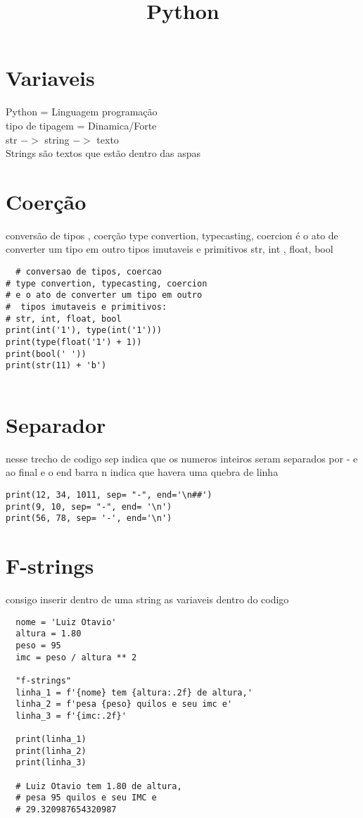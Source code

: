 \documentclass[16pts]{article}
\date{} %
\title{Python}
\begin{document}
\maketitle
\section{Variaveis}
Python = Linguagem programação\\
tipo de tipagem = Dinamica/Forte\\
str $->$ string $->$ texto\\
Strings são textos que estão dentro das aspas
\section{Coerção}
conversão de tipos , coerção
type convertion, typecasting, coercion
é o ato de converter um tipo em outro
tipos imutaveis e primitivos
str, int , float, bool 

\begin{lstlisting}
  # conversao de tipos, coercao
# type convertion, typecasting, coercion
# e o ato de converter um tipo em outro
#  tipos imutaveis e primitivos:
# str, int, float, bool
print(int('1'), type(int('1')))
print(type(float('1') + 1))
print(bool(' '))
print(str(11) + 'b')


\end{lstlisting}
\section{Separador}
nesse trecho de codigo  sep indica que os numeros inteiros seram separados
por - e ao final e o end barra n indica que havera uma quebra de linha
\begin{lstlisting}
print(12, 34, 1011, sep= "-", end='\n##')
print(9, 10, sep= "-", end= '\n')
print(56, 78, sep= '-', end='\n')
\end{lstlisting}
\section{F-strings}
consigo inserir dentro de uma string as variaveis dentro do codigo
\begin{lstlisting}
  nome = 'Luiz Otavio'
  altura = 1.80
  peso = 95
  imc = peso / altura ** 2
  
  "f-strings"
  linha_1 = f'{nome} tem {altura:.2f} de altura,'
  linha_2 = f'pesa {peso} quilos e seu imc e'
  linha_3 = f'{imc:.2f}'
  
  print(linha_1)
  print(linha_2)
  print(linha_3)
  
  # Luiz Otavio tem 1.80 de altura,
  # pesa 95 quilos e seu IMC e
  # 29.320987654320987
\end{lstlisting}  
\end{document}
